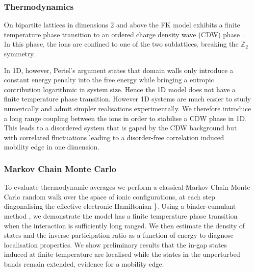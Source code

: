 \hypertarget{thermodynamics}{%
\subsubsection{Thermodynamics}\label{thermodynamics}}

On bipartite lattices in dimensions 2 and above the FK model exhibits a
finite temperature phase transition to an ordered charge density wave
(CDW) phase \textcite{maska_thermodynamics_2006-1}. In this phase, the
ions are confined to one of the two sublattices, breaking the
\(\mathbb{Z}_2\) symmetry.

In 1D, however, Periel's argument
\autocite{peierls_isings_1936,kennedy_itinerant_1986} states that domain
walls only introduce a constant energy penalty into the free energy
while bringing a entropic contribution logarithmic in system size. Hence
the 1D model does not have a finite temperature phase transition.
However 1D systems are much easier to study numerically and admit
simpler realisations experimentally. We therefore introduce a long range
coupling between the ions in order to stabilise a CDW phase in 1D. This
leads to a disordered system that is gaped by the CDW background but
with correlated fluctuations leading to a disorder-free correlation
induced mobility edge in one dimension.

\hypertarget{markov-chain-monte-carlo}{%
\subsubsection{Markov Chain Monte
Carlo}\label{markov-chain-monte-carlo}}

To evaluate thermodynamic averages we perform a classical Markov Chain
Monte Carlo random walk over the space of ionic configurations, at each
step diagonalising the effective electronic Hamiltonian
\textcite{maska_thermodynamics_2006-1}\}. Using a binder-cumulant method
\autocite{binder_finite_1981,musial_monte_2002}, we demonstrate the
model has a finite temperature phase transition when the interaction is
sufficiently long ranged. We then estimate the density of states and the
inverse participation ratio as a function of energy to diagnose
localisation properties. We show preliminary results that the in-gap
states induced at finite temperature are localised while the states in
the unperturbed bands remain extended, evidence for a mobility edge.

